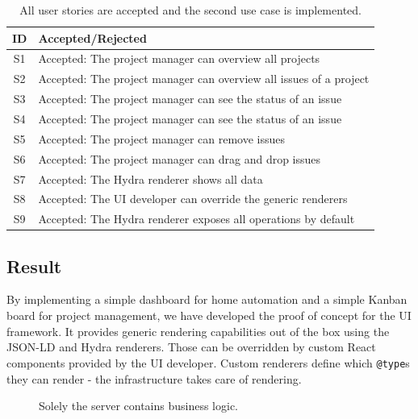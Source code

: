\begin{table}
  \begin{center}
    \begin{tabular}{ |c|l| }
      \hline
      \textbf{ID} & \textbf{Accepted/Rejected} \\
      \hline
      S1 & Accepted: The project manager can overview all projects \\
      \hline
      S2 & Accepted: The project manager can overview all issues of a project \\
      \hline
      S3 & Accepted: The project manager can see the status of an issue \\
      \hline
      S4 & Accepted: The project manager can see the status of an issue \\
      \hline
      S5 & Accepted: The project manager can remove issues \\
      \hline
      S6 & Accepted: The project manager can drag and drop issues \\
      \hline
      S7 & Accepted: The Hydra renderer shows all data \\
      \hline
      S8 & Accepted: The UI developer can override the generic renderers \\
      \hline
      S9 & Accepted: The Hydra renderer exposes all operations by default \\
      \hline
    \end{tabular}
    \caption{All user stories are accepted and the second use case is implemented.}
  \end{center}
\end{table}

\subsection{Result}
By implementing a simple dashboard for home automation and a simple Kanban board for project management, we have developed the proof of concept for the UI framework. It provides generic rendering capabilities out of the box using the JSON-LD and Hydra renderers. Those can be overridden by custom React components provided by the UI developer. Custom renderers define which \lstinline{@type}s they can render - the infrastructure takes care of rendering.

\begin{figure}[!htb]
  \caption{Solely the server contains business logic.}
  \label{fig:businesslogic}
\end{figure}

